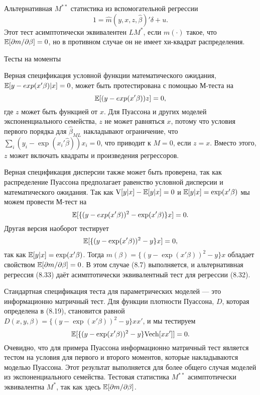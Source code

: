 Альтернативная $M^{**}$ статистика из вспомогательной регрессии
\begin{equation}
1 = \hat{m}(y,x,z,\hat{\beta})'\delta + u.
\end{equation}
Этот тест асимптотически эквивалентен $LM^*$, если $m(\cdot)$ такое, что $\mathbb{E}[\partial{m}/\partial{\beta}] = 0$, но в противном случае он не имеет хи-квадрат распределения.

\begin{center}
Тесты на моменты
\end{center}

Верная спецификация условной функции математического ожидания, $\mathbb{E}[y - exp(x'\beta)|x] = 0$, может быть протестирована с помощью М-теста на
\[
\mathbb{E}[(y - exp(x'\beta))z] = 0,
\]
где $z$ может быть функцией от $x$. Для Пуассона и других моделей экспоненциального семейства, $z$ не может равняться $x$, потому что 
условия первого порядка для $\hat{\beta}_{ML}$ накладывают ограничение, что $\sum_i (y_i - \exp(x_i'\hat{\beta}))x_i = 0$, что приводит к $M = 0$, если $z = x$. Вместо этого, $z$ может включать квадраты и произведения регрессоров.

Верная спецификация дисперсии также может быть проверена, так как распределение Пуассона предполагает равенство условной дисперсии и математического ожидания. Так как $\mathrm{V}[y|x] - \mathbb{E}[y|x] = 0$ и $\mathbb{E}[y|x] = \exp(x'\beta)$ мы можем провести М-тест на
\[
\mathbb{E}[\{(y - exp(x'\beta))^2 - \exp(x'\beta)\}x] = 0.
\]
Другая версия наоборот тестирует
\[
\mathbb{E}[\{(y - \exp(x'\beta))^2 - y\}x] = 0,
\]
так как $\mathbb{E}[y|x] = \exp(x'\beta)$. Тогда $m(\beta) = \{(y - \exp(x'\beta))^2 - y\}x$ обладает свойством $\mathbb{E}[\partial{m}/\partial{\beta}] = 0$. В этом случае (8.7) выполняется, и альтернативная регрессия (8.33) даёт асимптотически эквивалентный тест для регрессии (8.32).

Стандартная спецификация теста для параметрических моделей --- это информационно матричный тест. Для функции плотности Пуассона, $D$, которая определена в (8.19), становится равной $D(x,y,\beta) = \{(y - \exp(x'\beta))^2 - y\}xx'$, и мы тестируем 
\[
\mathbb{E}[\{(y - \exp(x'\beta))^2 - y\}\mathrm{Vech}[xx']] = 0.
\]
Очевидно, что для примера Пуассона информационно матричный тест является тестом на условия для первого и второго моментов, которые накладываются моделью Пуассона. Этот результат выполняется для более общего случая моделей из экспоненциального семейства. Тестовая статистика $M^{**}$ асимптотически эквивалентна $M^{*}$, так как здесь $\mathbb{E}[\partial{m}/\partial{\beta}]$.

